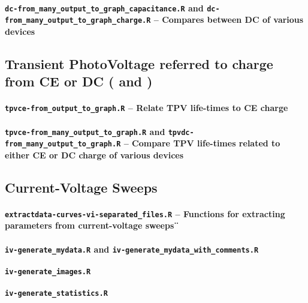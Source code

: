 		\paragraph{\texttt{dc-from\_many\_output\_to\_graph\_capacitance.R} and \texttt{dc-from\_many\_output\_to\_graph\_charge.R} -- Compares between DC of various devices}
		

	\subsection{Transient PhotoVoltage referred to charge from CE or DC ( and )}\label{r_tpvcedc}



		\paragraph{\texttt{tpvce-from\_output\_to\_graph.R} -- Relate TPV life\hyp{}times to CE charge}
		
				\paragraph{\texttt{tpvce-from\_many\_output\_to\_graph.R} and \texttt{tpvdc-from\_many\_output\_to\_graph.R} -- Compare TPV life\hyp{}times related to either CE or DC charge of various devices}

	\subsection{Current-Voltage Sweeps}
		\paragraph{\texttt{extractdata-curves-vi-separated\_files.R} -- Functions for extracting parameters from current\hyp{}voltage sweeps¨}
		\paragraph{\texttt{iv-generate\_mydata.R} and \texttt{iv-generate\_mydata\_with\_comments.R}}
		\paragraph{\texttt{iv-generate\_images.R}}
		\paragraph{\texttt{iv-generate\_statistics.R}}

